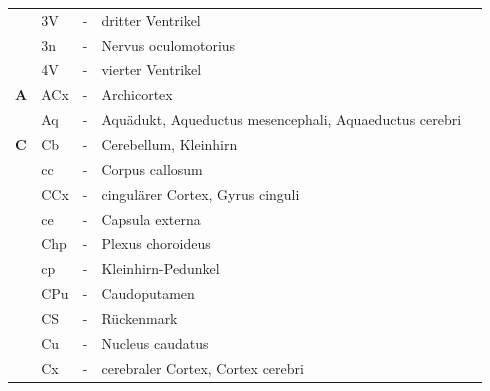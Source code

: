 \documentclass[12pt,a4paper,pdftex]{article}
\begin{document}
\begin{table}[H]
\begin{tabular}{llcll}
           & 3V  & - & dritter Ventrikel                                                       & \multicolumn{1}{c}{\textbf{}} \\
\textbf{}  & 3n  & -          & Nervus oculomotorius                                                        & \multicolumn{1}{c}{}          \\
\textbf{}  & 4V  & -          & vierter Ventrikel                                                       & \multicolumn{1}{c}{}          \\
\textbf{A} & ACx & -          & Archicortex                                                             & \multicolumn{1}{c}{}          \\
\textbf{}  & Aq  & -          & Aquädukt, Aqueductus mesencephali, Aquaeductus cerebri                  & \multicolumn{1}{c}{}          \\
\textbf{C} & Cb  & - & Cerebellum, Kleinhirn                                                   & \multicolumn{1}{c}{\textbf{}} \\
           & cc  & - & Corpus callosum                                                         & \multicolumn{1}{c}{\textbf{}} \\
\textbf{}  & CCx & -          & cingulärer Cortex, Gyrus cinguli             & \multicolumn{1}{c}{}          \\
\textbf{}  & ce  & -          & Capsula externa                                                         & \multicolumn{1}{c}{}          \\
\textbf{}  & Chp & -          & Plexus choroideus                                                          & \multicolumn{1}{c}{}          \\
\textbf{}  & cp  & -          & Kleinhirn-Pedunkel                                                      & \multicolumn{1}{c}{}          \\
\textbf{}  & CPu & -          & Caudoputamen                                                            &                               \\
\textbf{}  & CS  & -          & Rückenmark                                                              &                               \\
\textbf{}  & Cu  & -          & Nucleus caudatus                                                        &                               \\
\textbf{}  & Cx  & -          & cerebraler Cortex, Cortex cerebri          &                               \\

\end{tabular}
\end{table}
\end{document}
